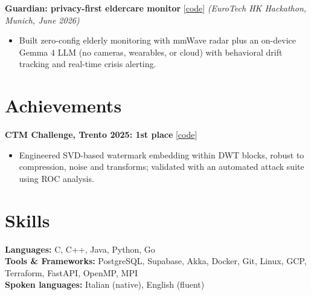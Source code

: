 \projectdivider
\textbf{Guardian: privacy-first eldercare monitor} [\href{https://github.com/MaiDormo/Guardian}{code}] \textit{(EuroTech HK Hackathon, Munich, June 2026)}
\begin{itemize}[nosep, after=\strut, leftmargin=1.5em, itemsep=2pt, label=\color{accent}\textbullet]
    \item Built zero-config elderly monitoring with mmWave radar plus an on-device Gemma 4 LLM (no cameras, wearables, or cloud) with behavioral drift tracking and real-time crisis alerting.
\end{itemize}

\section{Achievements}
\textbf{CTM Challenge, Trento 2025: 1st place} [\href{https://github.com/MaiDormo/DWT-SVD-watermarking}{code}]
\begin{itemize}[nosep, after=\strut, leftmargin=1.5em, itemsep=2pt, label=\color{accent}\textbullet]
    \item Engineered SVD-based watermark embedding within DWT blocks, robust to compression, noise and transforms; validated with an automated attack suite using ROC analysis.
\end{itemize}

\section{Skills}
\small
\textbf{Languages:} C, C++, Java, Python, Go \\
\textbf{Tools \& Frameworks:} PostgreSQL, Supabase, Akka, Docker, Git, Linux, GCP, Terraform, FastAPI, OpenMP, MPI \\
\textbf{Spoken languages:} Italian (native), English (fluent)


